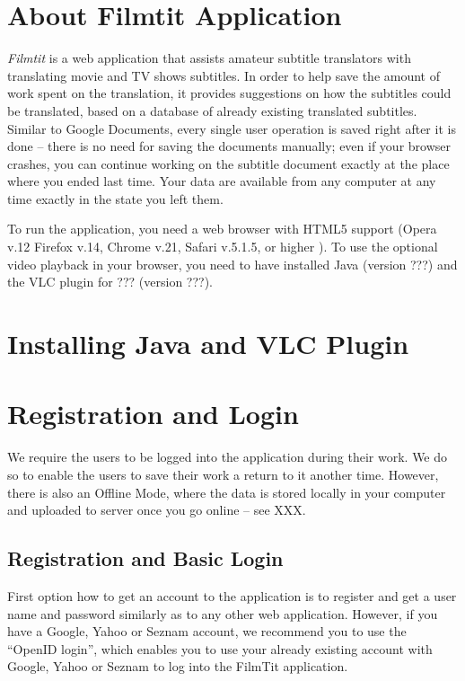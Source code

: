 \label{chap:users_manual}

\section{About Filmtit Application}

\emph{Filmtit} is a web application that assists amateur subtitle translators with translating movie and TV shows subtitles. In order to help save the amount of work spent on the translation, it provides suggestions on how the subtitles could be translated, based on a database of already existing translated subtitles. Similar to Google Documents, every single user operation is saved right after it is done -- there is no need for saving the documents manually; even if your browser crashes, you can continue working on the subtitle document exactly at the place where you ended last time. Your data are available from any computer at any time exactly in the state you left them.

To run the application, you need a web browser with HTML5 support (Opera v.12
Firefox v.14, Chrome v.21, Safari v.5.1.5, or higher ). To use the optional video playback in your browser, you need to have installed Java (version ???) and the VLC plugin for ??? (version ???).

\section{Installing Java and VLC Plugin}


\section{Registration and Login}

We require the users to be logged into the application during their work. We do so to enable the users to save their work a return to it another time. However, there is also an Offline Mode, where the data is stored locally in your computer and uploaded to server once you go online -- see XXX.

\subsection{Registration and Basic Login}

First option how to get an account to the application is to register and get a user name and password similarly as to any other web application. However, if you have a Google, Yahoo or Seznam account, we recommend you to use the ``OpenID login'', which enables you to use your already existing account with Google, Yahoo or Seznam to log into the FilmTit application.

